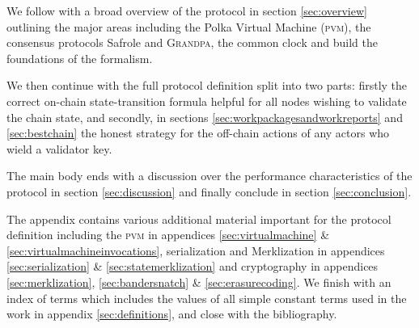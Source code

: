 We follow with a broad overview of the protocol in section \ref{sec:overview} outlining the major areas including the Polka Virtual Machine (\textsc{pvm}), the consensus protocols Safrole and \textsc{Grandpa}, the common clock and build the foundations of the formalism.

We then continue with the full protocol definition split into two parts: firstly the correct on-chain state-transition formula helpful for all nodes wishing to validate the chain state, and secondly, in sections \ref{sec:workpackagesandworkreports} and \ref{sec:bestchain} the honest strategy for the off-chain actions of any actors who wield a validator key.

The main body ends with a discussion over the performance characteristics of the protocol in section \ref{sec:discussion} and finally conclude in section \ref{sec:conclusion}.

The appendix contains various additional material important for the protocol definition including the \textsc{pvm} in appendices \ref{sec:virtualmachine} \& \ref{sec:virtualmachineinvocations}, serialization and Merklization in appendices \ref{sec:serialization} \& \ref{sec:statemerklization} and cryptography in appendices \ref{sec:merklization}, \ref{sec:bandersnatch} \& \ref{sec:erasurecoding}. We finish with an index of terms which includes the values of all simple constant terms used in the work in appendix \ref{sec:definitions}, and close with the bibliography.